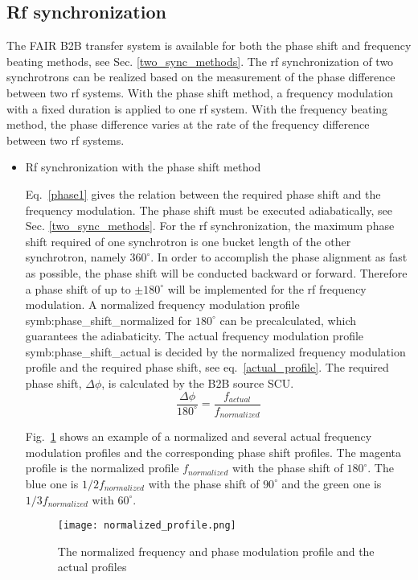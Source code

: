 \subsection{Rf synchronization}
The FAIR B2B transfer system is available for both the phase shift and frequency beating methods, see Sec. \ref{two_sync_methods}. The rf synchronization of two synchrotrons can be realized based on the measurement of the phase difference between two rf systems. With the phase shift method, a frequency modulation with a fixed duration is applied to one rf system. With the frequency beating method, the phase difference varies at the rate of the frequency difference between two rf systems.
\begin{itemize}
\item Rf synchronization with the phase shift method

 
Eq.~\ref{phase1} gives the relation between the required phase shift and the frequency modulation. The phase shift must be executed adiabatically, see Sec. \ref{two_sync_methods}. For the rf synchronization, the maximum phase shift required of one synchrotron is one bucket length of the other synchrotron, namely $360^\circ$. In order to accomplish the phase alignment as fast as possible, the phase shift will be conducted backward or forward. Therefore a phase shift of up to $\pm 180^\circ$ will be implemented for the rf frequency modulation. A normalized frequency modulation profile \gls{symb:phase_shift_normalized} for $180^\circ$ can be precalculated, which guarantees the adiabaticity. The actual frequency modulation profile \gls{symb:phase_shift_actual} is decided by the normalized frequency modulation profile and the required phase shift, see eq.~\ref{actual_profile}. The required phase shift, $\Delta \phi$, is calculated by the B2B source SCU.
\begin{equation}
\frac{\Delta \phi}{180^\circ}= \frac{f_{\mathit{actual}}}{f_{\mathit{normalized}}} \label{actual_profile}
\end{equation}

Fig.~\ref{normalized_profile} shows an example of a normalized and several actual frequency  modulation profiles and the corresponding phase shift profiles. The magenta profile is the normalized profile $f_{normalized}$ with the phase shift of $180^\circ$. The blue one is $1/2 f_{\mathit{normalized}}$ with the phase shift of $90^\circ$ and the green one is $1/3 f_{\mathit{normalized}}$ with $60^\circ$. 
\begin{figure}[H]
   \centering   
   \texttt{[image: normalized\_profile.png]}
   \caption{The normalized frequency and phase modulation profile and the actual profiles}
   \label{normalized_profile}
\end{figure}  


\end{itemize}
